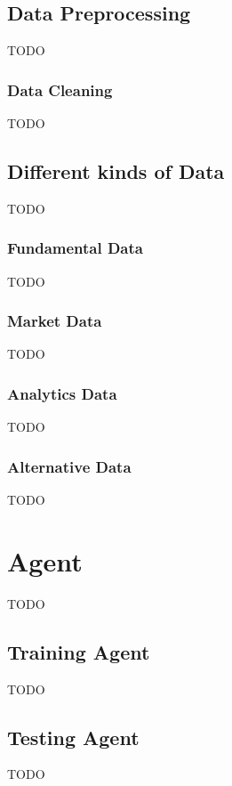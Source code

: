 \begin{itemize}
\section{Data Preprocessing}\label{sec:data-preprocessing}
TODO

\subsection{Data Cleaning}\label{subsec:data-cleaning}
TODO


\section{Different kinds of Data}\label{sec:different-kinds-of-data}
TODO

\subsection{Fundamental Data}\label{subsec:fundamental-data}
TODO

\subsection{Market Data}\label{subsec:market-data}
TODO

\subsection{Analytics Data}\label{subsec:analytics-data}
TODO

\subsection{Alternative Data}\label{subsec:alternative-data}
TODO




\chapter{Agent}\label{ch:agent}
TODO


\section{Training Agent}\label{sec:training-agent}
TODO


\section{Testing Agent}\label{sec:testing-agent}
TODO



\end{itemize}
